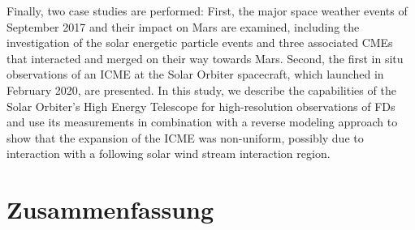Finally, two case studies are performed: First, the major space weather events of September 2017 and their impact on Mars are examined, including the investigation of the solar energetic particle events and three associated \acp{CME} that interacted and merged on their way towards Mars. Second, the first in situ observations of an \ac{ICME} at the Solar Orbiter spacecraft, which launched in February 2020, are presented. In this study, we describe the capabilities of the Solar Orbiter's High Energy Telescope for high-resolution observations of \aclp{FD} and use its measurements in combination with a reverse modeling approach to show that the expansion of the \ac{ICME} was non-uniform, possibly due to interaction with a following solar wind stream interaction region.


\cleardoublepage
{}
\chapter*{Zusammenfassung}

